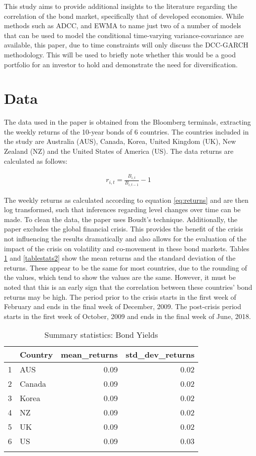 \documentclass[11pt,preprint, authoryear]{elsarticle}
\numberwithin{equation}{section}
\numberwithin{figure}{section}
\numberwithin{table}{section}
\begin{document}
This study aims to provide additional insights to the literature
regarding the correlation of the bond market, specifically that of
developed economies. While methods such as ADCC, and EWMA to name just
two of a number of models that can be used to model the conditional
time-varying variance-covariance are available, this paper, due to time
constraints will only discuss the DCC-GARCH methodology. This will be
used to briefly note whether this would be a good portfolio for an
investor to hold and demonstrate the need for diversification.

\section{\texorpdfstring{Data \label{data}}{Data }}\label{data}

The data used in the paper is obtained from the Bloomberg terminals,
extracting the weekly returns of the 10-year bonds of 6 countries. The
countries included in the study are Australia (AUS), Canada, Korea,
United Kingdom (UK), New Zealand (NZ) and the United States of America
(US). The data returns are calculated as follows:

\begin{align} \label{eq:returns}
r_{i,t} = \frac{B_{i,t}}{B_{i,t-1}} - 1
\end{align}

The weekly returns as calculated according to equation \ref{eq:returns}
and are then log transformed, such that inferences regarding level
changes over time can be made. To clean the data, the paper uses Boudt's
technique. Additionally, the paper excludes the global financial crisis.
This provides the benefit of the crisis not influencing the results
dramatically and also allows for the evaluation of the impact of the
crisis on volatility and co-movement in these bond markets. Tables
\ref{tablestats} and \ref{tablestats2} show the mean returns and the
standard deviation of the returns. These appear to be the same for most
countries, due to the rounding of the values, which tend to show the
values are the same. However, it must be noted that this is an early
sign that the correlation between these countries' bond returns may be
high. The period prior to the crisis starts in the first week of
February and ends in the final week of December, 2009. The post-crisis
period starts in the first week of October, 2009 and ends in the final
week of June, 2018.

\begin{longtable}{rlrr}
  \hline
 & Country & mean\_returns & std\_dev\_returns \\ 
  \hline
1 & AUS & 0.09 & 0.02 \\ 
  2 & Canada & 0.09 & 0.02 \\ 
  3 & Korea & 0.09 & 0.02 \\ 
  4 & NZ & 0.09 & 0.02 \\ 
  5 & UK & 0.09 & 0.02 \\ 
  6 & US & 0.09 & 0.03 \\ 
   \hline
\hline
\caption{Summary statistics: Bond Yields \label{tablestats}} 
\end{longtable}
\end{document}
